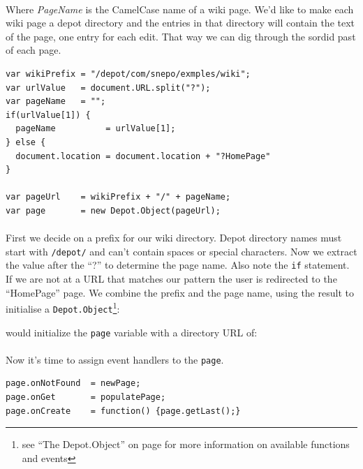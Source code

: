 \documentclass{report}
\begin{document}

\paragraph{}
Where \textit{PageName} is the CamelCase name of a wiki page. We'd
like to make each wiki page a depot directory and the entries in that
directory will contain the text of the page, one entry for each
edit. That way we can dig through the sordid past of each page. 

\begin{Verbatim}[frame=single]
var wikiPrefix = "/depot/com/snepo/exmples/wiki";
var urlValue   = document.URL.split("?");
var pageName   = "";
if(urlValue[1]) {
  pageName          = urlValue[1];
} else {
  document.location = document.location + "?HomePage"
}

var pageUrl    = wikiPrefix + "/" + pageName;
var page       = new Depot.Object(pageUrl);
\end{Verbatim}

\paragraph{}
First we decide on a prefix for our wiki directory. Depot directory
names must start with \texttt{/depot/} and can't contain spaces or
special characters. Now we extract the value after the ``?'' to
determine the page name. Also note the \texttt{if} statement. If we
are not at a URL that matches our pattern the user is redirected to
the ``HomePage'' page. We combine the prefix and the page name, using the
result to initialise a \texttt{Depot.Object}\footnote{see ``The
  Depot.Object'' on page \pageref{depot.object} for more information
  on available functions and events}:

\pagebreak


would initialize the \texttt{page} variable with a directory URL of:


\paragraph{}
Now it's time to assign event handlers to the \texttt{page}.

\begin{Verbatim}[frame=single]
page.onNotFound  = newPage;
page.onGet       = populatePage;
page.onCreate    = function() {page.getLast();}
\end{Verbatim}
\end{document}
